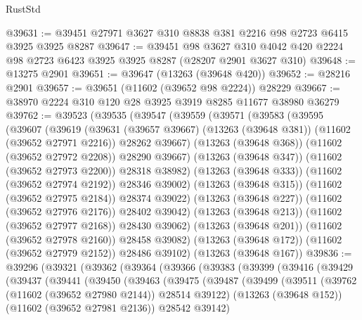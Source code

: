 \begin{lexlean}{RustStd}
\begin{coremodule}
@39631 := @39451 @27971 @3627 @310 @8838 @381 @2216 @98 @2723 @6415 @3925 @3925 @8287
@39647 := @39451
    @98
    @3627
    @310
    @4042
    @420
    @2224
    @98
    @2723
    @6423
    @3925
    @3925
    @8287
    (@28207 @2901 @3627 @310)
@39648 := @13275 @2901
@39651 := @39647 (@13263 (@39648 @420))
@39652 := @28216 @2901
@39657 := @39651 (@11602 (@39652 @98 @2224)) @28229
@39667 := @38970 @2224 @310 @120 @28 @3925 @3919 @8285 @11677 @38980 @36279
@39762 := @39523
    (@39535
      (@39547
        (@39559
          (@39571
            (@39583
              (@39595
                (@39607
                  (@39619
                    (@39631
                      (@39657 @39667)
                      (@13263 (@39648 @381))
                      (@11602 (@39652 @27971 @2216))
                      @28262
                      @39667)
                    (@13263 (@39648 @368))
                    (@11602 (@39652 @27972 @2208))
                    @28290
                    @39667)
                  (@13263 (@39648 @347))
                  (@11602 (@39652 @27973 @2200))
                  @28318
                  @38982)
                (@13263 (@39648 @333))
                (@11602 (@39652 @27974 @2192))
                @28346
                @39002)
              (@13263 (@39648 @315))
              (@11602 (@39652 @27975 @2184))
              @28374
              @39022)
            (@13263 (@39648 @227))
            (@11602 (@39652 @27976 @2176))
            @28402
            @39042)
          (@13263 (@39648 @213))
          (@11602 (@39652 @27977 @2168))
          @28430
          @39062)
        (@13263 (@39648 @201))
        (@11602 (@39652 @27978 @2160))
        @28458
        @39082)
      (@13263 (@39648 @172))
      (@11602 (@39652 @27979 @2152))
      @28486
      @39102)
    (@13263 (@39648 @167))
@39836 := @39296
    (@39321
      (@39362
        (@39364
          (@39366
            (@39383
              (@39399
                (@39416
                  (@39429
                    (@39437
                      (@39441
                        (@39450
                          (@39463
                            (@39475
                              (@39487
                                (@39499
                                  (@39511
                                    (@39762 (@11602 (@39652 @27980 @2144)) @28514 @39122)
                                    (@13263 (@39648 @152))
                                    (@11602 (@39652 @27981 @2136))
                                    @28542
                                    @39142)

\end{coremodule}
\end{lexlean}
